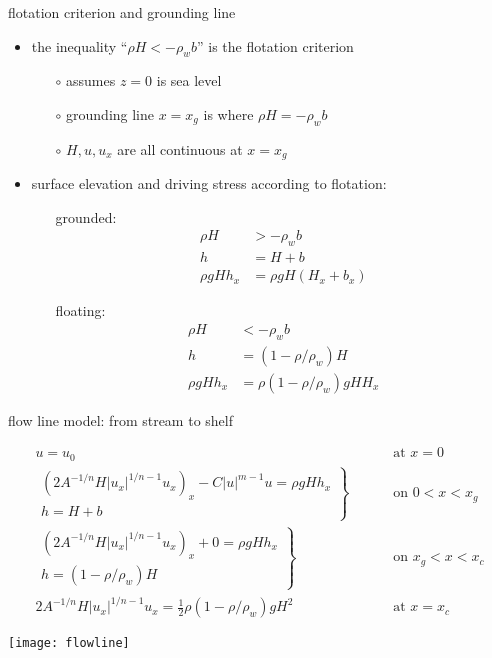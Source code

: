 \begin{frame}{flotation criterion and grounding line}

\begin{itemize}
\item the inequality ``$\rho H < - \rho_w b$'' is the \alert{flotation criterion}
  \begin{itemize}
  \item[$\circ$] assumes $z=0$ is sea level
  \item[$\circ$] grounding line $x=x_g$ is where $\rho H = - \rho_w b$
  \item[$\circ$] $H,u,u_x$ are all continuous at $x=x_g$
  \end{itemize}
\item surface elevation and driving stress according to flotation:
  \begin{itemize}
  \item[grounded:]
\begin{align*}
\rho H &> - \rho_w b \\
h &= H + b \\
\rho g H h_x &= \rho g H (H_x + b_x)
\end{align*}
  \item[floating:]
\begin{align*}
\rho H &< - \rho_w b \\
h &= (1-\rho/\rho_w) H \\
\rho g H h_x &= \rho(1-\rho/\rho_w) g H H_x
\end{align*}  
  \end{itemize}
\end{itemize}
\end{frame}


\begin{frame}{flow line model: from stream to shelf}
\label{slide:streamtoshelf}

\small
\begin{align*}
  u = u_0 & \qquad \text{ at } x = 0 \\
  \left.\begin{array}{r}
  \left(2 A^{-1/n} H |u_x|^{1/n - 1} u_x\right)_x - C|u|^{m-1}u = \rho g H h_x \\
  h = H + b
  \end{array}\right\}& \qquad \text{ on } 0 < x < x_g \\
  \left.\begin{array}{r}
  \left(2 A^{-1/n} H |u_x|^{1/n - 1} u_x\right)_x + 0 = \rho g H h_x \\
  h = (1-\rho/\rho_w) H
  \end{array}\right\}& \qquad \text{ on } x_g < x < x_c \\
  2 A^{-1/n} H |u_x|^{1/n - 1} u_x = \frac{1}{2}\rho (1-\rho/\rho_w) g H^2 & \qquad \text{ at } x = x_c
\end{align*}

\bigskip\bigskip
\begin{center}
  \texttt{[image: flowline]}
\end{center}
\end{frame}


